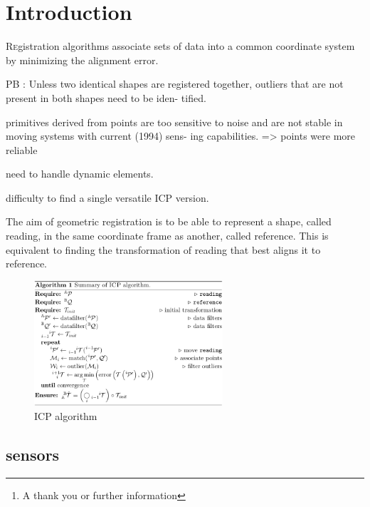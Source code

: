 \documentclass[twoside,twocolumn]{article}
\title{\citetitle{pomerleau_review_2015}} %
\author{%
\textsc{Virgile Daugé}\thanks{A thank you or further information} \\[1ex] %
\normalsize University of Lorraine \\ %
\normalsize \href{mailto:virgile.dauge@inria.fr}{virgile.dauge@inria.fr} %
}
\date{\today} %
\begin{document}
\maketitle


\section{Introduction}

\lettrine[nindent=0em,lines=3]{R}egistration algorithms associate sets of data
into a common coordinate system by minimizing the alignment error.

PB : Unless two identical shapes are registered
together, outliers that are not present in both shapes need to be iden-
tified.

primitives derived from points are too sensitive to
noise and are not stable in moving systems with current (1994) sens-
ing capabilities.
=> points were more reliable

need to handle dynamic elements.

difficulty to find a single versatile ICP version.

The aim of geometric registration is to be able to represent a shape,
called reading, in the same coordinate frame as another, called
reference.
This is equivalent to finding the transformation of reading
that best aligns it to reference.

\begin{figure}
  \includegraphics[angle=90,width=7cm]{ICPalgo}
  \caption{ICP algorithm}
  \label{fig:ICPalgo}
\end{figure}

\subsection{sensors}
\end{document}
